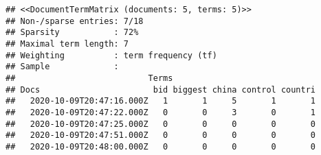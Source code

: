 \documentclass[
]{article}
\newenvironment{Shaded}{\begin{snugshade}}{\end{snugshade}}
\newcommand{\CommentTok}[1]{\textcolor[rgb]{0.56,0.35,0.01}{\textit{#1}}}
\newcommand{\DecValTok}[1]{\textcolor[rgb]{0.00,0.00,0.81}{#1}}
\newcommand{\KeywordTok}[1]{\textcolor[rgb]{0.13,0.29,0.53}{\textbf{#1}}}
\newcommand{\NormalTok}[1]{#1}
\newcommand{\OperatorTok}[1]{\textcolor[rgb]{0.81,0.36,0.00}{\textbf{#1}}}
\newcommand{\StringTok}[1]{\textcolor[rgb]{0.31,0.60,0.02}{#1}}
\begin{document}
\begin{Shaded}
\end{Shaded}

\begin{verbatim}
## <<DocumentTermMatrix (documents: 5, terms: 5)>>
## Non-/sparse entries: 7/18
## Sparsity           : 72%
## Maximal term length: 7
## Weighting          : term frequency (tf)
## Sample             :
##                           Terms
## Docs                       bid biggest china control countri
##   2020-10-09T20:47:16.000Z   1       1     5       1       1
##   2020-10-09T20:47:22.000Z   0       0     3       0       1
##   2020-10-09T20:47:25.000Z   0       0     0       0       0
##   2020-10-09T20:47:51.000Z   0       0     0       0       0
##   2020-10-09T20:48:00.000Z   0       0     0       0       0
\end{verbatim}

\begin{Shaded}
\end{Shaded}
\end{document}
